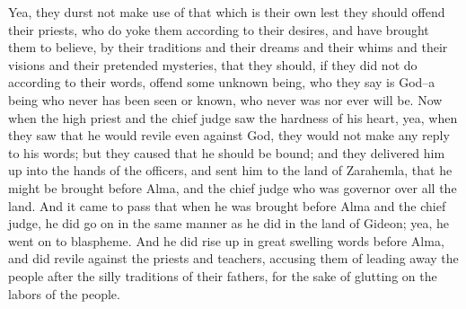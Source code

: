 \bverse \iffalse Yea, they durst not make use of that which is their own lest they should offend their priests, who do yoke them according to their desires, and have brought them to believe, by their traditions and their dreams and their whims and their visions and their pretended mysteries, that they should, if they did not do according to their words, offend some unknown being, who they say is God--a being who never has been seen or known, who never was nor ever will be. \fi
Yea, they durst not make use of that which is their own lest they should offend their priests, who do yoke them according to their desires, and have brought them to believe, by their traditions and their dreams and their whims and their visions and their pretended mysteries, that they should, if they did not do according to their words, offend some unknown being, who they say is God--a being who never has been seen or known, who never was nor ever will be.
\bverse \iffalse Now when the high priest and the chief judge saw the hardness of his heart, yea, when they saw that he would revile even against God, they would not make any reply to his words; but they caused that he should be bound; and they delivered him up into the hands of the officers, and sent him to the land of Zarahemla, that he might be brought before Alma, and the chief judge who was governor over all the land. \fi
Now when the high priest and the chief judge saw the hardness of his heart, yea, when they saw that he would revile even against God, they would not make any reply to his words; but they caused that he should be bound; and they delivered him up into the hands of the officers, and sent him to the land of Zarahemla, that he might be brought before Alma, and the chief judge who was governor over all the land.
\bverse \iffalse And it came to pass that when he was brought before Alma and the chief judge, he did go on in the same manner as he did in the land of Gideon; yea, he went on to blaspheme. \fi
And it came to pass that when he was brought before Alma and the chief judge, he did go on in the same manner as he did in the land of Gideon; yea, he went on to blaspheme.
\bverse \iffalse And he did rise up in great swelling words before Alma, and did revile against the priests and teachers, accusing them of leading away the people after the silly traditions of their fathers, for the sake of glutting on the labors of the people. \fi
And he did rise up in great swelling words before Alma, and did revile against the priests and teachers, accusing them of leading away the people after the silly traditions of their fathers, for the sake of glutting on the labors of the people.
